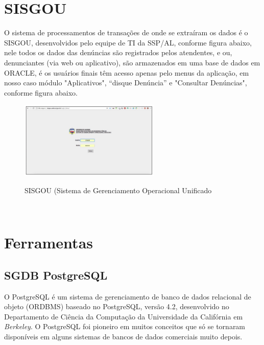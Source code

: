 \section{SISGOU}

O sistema de processamentos de transa\c{c}\~{o}es de onde se extra\'{i}ram os dados \'{e} o SISGOU, desenvolvidos pelo equipe de TI da SSP/AL, conforme figura abaixo, nele todos os dados das denúncias s\~{a}o registrados pelos atendentes, e ou, denunciantes (via web ou aplicativo), s\~{a}o armazenados em uma base de dados em ORACLE, \'{e} os usu\'{a}rios finais têm acesso apenas pelo menus da aplica\c{c}\~{a}o, em nosso caso m\'odulo "Aplicativos", ``disque Denúncia'' e "Consultar Denúncias", conforme figura abaixo.

\begin{figure}[H]
	\vspace*{0,2cm}
    \centering
    \caption{SISGOU (Sistema de Gerenciamento Operacional Unificado}
    \includegraphics[width=0.6\textwidth]{./04-figuras/figura-13}
    \label{fig:ilustfig13}
\end{figure}
\vspace*{-0,9cm}
{\raggedright {}}\\


\section{Ferramentas}


\subsection{SGDB PostgreSQL}

O PostgreSQL \'{e} um sistema de gerenciamento de banco de dados relacional de objeto (ORDBMS) baseado no PostgreSQL, vers\~{a}o 4.2, desenvolvido no Departamento de Ciência da Computa\c{c}\~{a}o da Universidade da Calif\'ornia em \textit{Berkeley}. O PostgreSQL foi pioneiro em muitos conceitos que s\'o se tornaram dispon\'{i}veis em alguns sistemas de bancos de dados comerciais muito depois.

